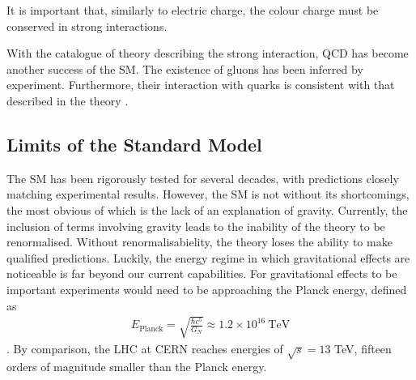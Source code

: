 \noindent It is important that, similarly to electric charge, the colour charge must be conserved in strong interactions.

With the catalogue of theory describing the strong interaction, QCD has become another success of the SM.
The existence of gluons has been inferred by experiment.
Furthermore, their interaction with quarks is consistent with that described in the theory \cite{brandelik1979evidence}.

\subsection{Limits of the Standard Model}
The SM has been rigorously tested for several decades, with predictions closely matching experimental results.
However, the SM is not without its shortcomings, the most obvious of which is the lack of an explanation of gravity.
Currently, the inclusion of terms involving gravity leads to the inability of the theory to be renormalised.
Without renormalisabielity, the theory loses the ability to make qualified predictions. 
Luckily, the energy regime in which gravitational effects are noticeable is far beyond our current capabilities.
For gravitational effects to be important experiments would need to be approaching the Planck energy, defined as
\begin{align}
E_{\textrm{Planck}} = \sqrt{\frac{\hbar c^{5}}{G_{N}}} \approx 1.2 \times 10^{16}\ \textrm{TeV}
\end{align}
\cite{ade2014planck}. 
By comparison, the LHC at CERN reaches energies of $\sqrt{s} = 13$ TeV, fifteen orders of magnitude smaller than the Planck energy.

